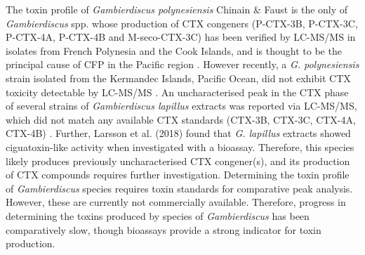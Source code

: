 \documentclass[12pt]{article}
\begin{document}
The toxin profile of \textit{Gambierdiscus polynesiensis} Chinain \& Faust is the only of \emph{Gambierdiscus} spp.
whose production of CTX congeners (P-CTX-3B, P-CTX-3C, P-CTX-4A, P-CTX-4B and M-seco-CTX-3C) has been verified by LC-MS/MS in isolates from French Polynesia and the Cook Islands, and is thought to be the principal cause of CFP in the Pacific region \citep{chinain2010growth,rhodes2014production}. 
However recently, a \emph{G. polynesiensis} strain isolated from the Kermandec Islands, Pacific Ocean, did not exhibit CTX toxicity detectable by LC-MS/MS  \citep{rhodes2017epiphytic}.
An uncharacterised peak in the CTX phase of several strains of \emph{Gambierdiscus lapillus} extracts was reported via LC-MS/MS, which did not match any available CTX standards (CTX-3B, CTX-3C, CTX-4A, CTX-4B) \citep{kretzschmar2017characterization}. 
Further, Larsson et al. (2018) found that \emph{G. lapillus} extracts showed ciguatoxin-like activity when investigated with a bioassay. 
Therefore, this species likely produces previously uncharacterised CTX congener(s), and its production of CTX compounds requires further investigation.
Determining the toxin profile of \textit{Gambierdiscus} species requires toxin standards for comparative peak analysis. 
However, these are currently not commercially available. 
Therefore, progress in determining the toxins produced by species of \emph{Gambierdiscus} has been comparatively slow, though bioassays provide a strong indicator for toxin production.\\

\end{document}
